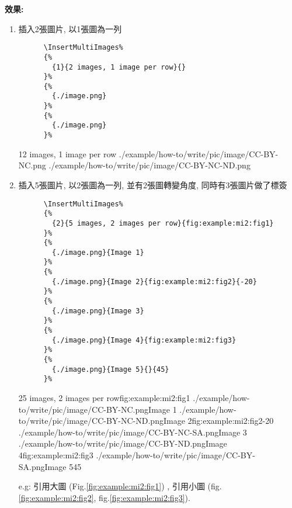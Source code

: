   {\bf 效果:}
  \begin{enumerate}
    \item
    {
      插入2張圖片, 以1張圖為一列
      \begin{verbatim}
      \InsertMultiImages%
      {%
        {1}{2 images, 1 image per row}{}
      }%
      {%
        {./image.png}
      }%
      {%
        {./image.png}
      }%
      \end{verbatim}
      \InsertMultiImages%
      {%
        {1}{2 images, 1 image per row}{}
      }%
      {%
        {./example/how-to/write/pic/image/CC-BY-NC.png}
      }%
      {%
        {./example/how-to/write/pic/image/CC-BY-NC-ND.png}
      }%
    } %

    \newpage

    \item
    {
      插入5張圖片, 以2張圖為一列, 並有2張圖轉變角度, 同時有3張圖片做了標簽
      \begin{verbatim}
      \InsertMultiImages%
      {%
        {2}{5 images, 2 images per row}{fig:example:mi2:fig1}
      }%
      {%
        {./image.png}{Image 1}
      }%
      {%
        {./image.png}{Image 2}{fig:example:mi2:fig2}{-20}
      }%
      {%
        {./image.png}{Image 3}
      }%
      {%
        {./image.png}{Image 4}{fig:example:mi2:fig3}
      }%
      {%
        {./image.png}{Image 5}{}{45}
      }%
      \end{verbatim}
      \InsertMultiImages%
      {%
        {2}{5 images, 2 images per row}{fig:example:mi2:fig1}
      }%
      {%
        {./example/how-to/write/pic/image/CC-BY-NC.png}{Image 1}
      }%
      {%
        {./example/how-to/write/pic/image/CC-BY-NC-ND.png}{Image 2}{fig:example:mi2:fig2}{-20}
      }%
      {%
        {./example/how-to/write/pic/image/CC-BY-NC-SA.png}{Image 3}
      }%
      {%
        {./example/how-to/write/pic/image/CC-BY-ND.png}{Image 4}{fig:example:mi2:fig3}
      }%
      {%
        {./example/how-to/write/pic/image/CC-BY-SA.png}{Image 5}{}{45}
      }%
    } %

      e.g: 
      引用大圖 (Fig.\ref{fig:example:mi2:fig1}) ,
      引用小圖 (fig.\ref{fig:example:mi2:fig2}, fig.\ref{fig:example:mi2:fig3}).
  \end{enumerate}

\EndChapter
